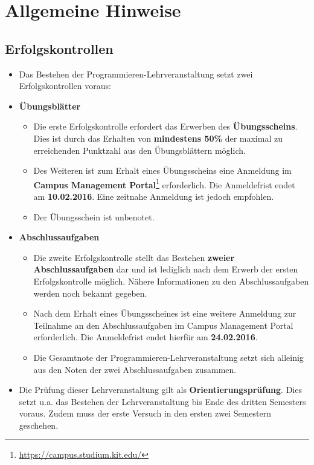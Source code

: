 \section*{Allgemeine Hinweise}

\subsection*{Erfolgskontrollen}
\begin{itemize}
	\item Das Bestehen der Programmieren-Lehrveranstaltung setzt zwei Erfolgskontrollen voraus:
	\item \textbf{Übungsblätter}
	\begin{itemize}
		\item Die erste Erfolgskontrolle erfordert das Erwerben des \textbf{Übungsscheins}.
		Dies ist durch das Erhalten von \textbf{mindestens 50\%} der maximal zu
		erreichenden Punktzahl aus den Übungsblättern möglich.
		\item Des Weiteren ist zum Erhalt eines Übungsscheins eine Anmeldung im
		\textbf{Campus Management Portal}\footnote{\url{https://campus.studium.kit.edu/}} erforderlich. Die Anmeldefrist endet am \textbf{10.02.2016}. Eine zeitnahe Anmeldung ist jedoch empfohlen.
		\item Der Übungsschein ist unbenotet.
	\end{itemize}
	\item \textbf{Abschlussaufgaben}
	\begin{itemize}	
		\item Die zweite Erfolgskontrolle stellt das Bestehen \textbf{zweier
		Abschlussaufgaben} dar und ist lediglich nach dem Erwerb der ersten
		Erfolgskontrolle möglich. Nähere Informationen zu den Abschlussaufgaben werden
		noch bekannt gegeben.
		\item Nach dem Erhalt eines Übungsscheines ist eine weitere Anmeldung zur
		Teilnahme an den Abschlussaufgaben im Campus Management Portal erforderlich. Die Anmeldefrist endet hierfür am \textbf{24.02.2016}.
		\item Die Gesamtnote der Programmieren-Lehrveranstaltung setzt sich alleinig aus den Noten der zwei Abschlussaufgaben zusammen.
	\end{itemize}
	\item Die Prüfung dieser Lehrveranstaltung gilt als
	\textbf{Orientierungsprüfung}. Dies setzt u.a. das Bestehen der
	Lehrveranstaltung bis Ende des dritten Semesters voraus. Zudem muss der erste
	Versuch in den ersten zwei Semestern geschehen.
\end{itemize}


